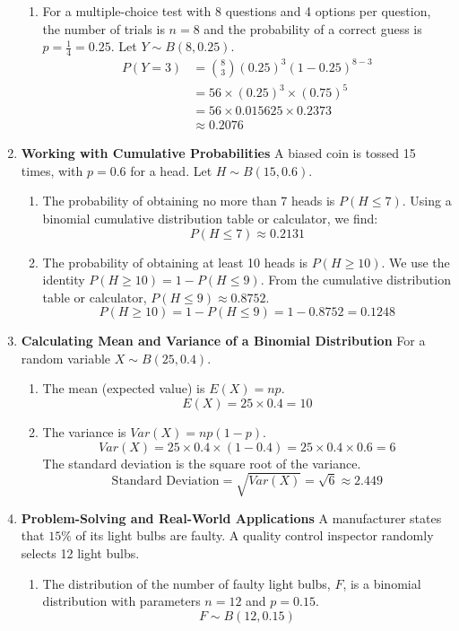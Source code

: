 \documentclass[12pt]{article}
\begin{document}
\begin{enumerate}
\begin{enumerate}
        \item For a multiple-choice test with 8 questions and 4 options per question, the number of trials is $n=8$ and the probability of a correct guess is $p = \frac{1}{4} = 0.25$. Let $Y \sim B(8, 0.25)$.
        \begin{align*}
        P(Y=3) &= \binom{8}{3} (0.25)^3 (1-0.25)^{8-3} \\
        &= 56 \times (0.25)^3 \times (0.75)^5 \\
        &= 56 \times 0.015625 \times 0.2373 \\
        &\approx 0.2076
        \end{align*}
    \end{enumerate}

    \item \textbf{Working with Cumulative Probabilities}
    A biased coin is tossed 15 times, with $p=0.6$ for a head. Let $H \sim B(15, 0.6)$.
    \begin{enumerate}
        \item The probability of obtaining no more than 7 heads is $P(H \le 7)$. Using a binomial cumulative distribution table or calculator, we find:
        $$ P(H \le 7) \approx 0.2131 $$

        \item The probability of obtaining at least 10 heads is $P(H \ge 10)$. We use the identity $P(H \ge 10) = 1 - P(H \le 9)$.
        From the cumulative distribution table or calculator, $P(H \le 9) \approx 0.8752$.
        $$ P(H \ge 10) = 1 - P(H \le 9) = 1 - 0.8752 = 0.1248 $$
    \end{enumerate}

    \item \textbf{Calculating Mean and Variance of a Binomial Distribution}
    For a random variable $X \sim B(25, 0.4)$.
    \begin{enumerate}
        \item The mean (expected value) is $E(X) = np$.
        $$ E(X) = 25 \times 0.4 = 10 $$

        \item The variance is $Var(X) = np(1-p)$.
        $$ Var(X) = 25 \times 0.4 \times (1-0.4) = 25 \times 0.4 \times 0.6 = 6 $$
        The standard deviation is the square root of the variance.
        $$ \text{Standard Deviation} = \sqrt{Var(X)} = \sqrt{6} \approx 2.449 $$
    \end{enumerate}

    \item \textbf{Problem-Solving and Real-World Applications}
    A manufacturer states that $15\%$ of its light bulbs are faulty. A quality control inspector randomly selects 12 light bulbs.
    \begin{enumerate}
        \item The distribution of the number of faulty light bulbs, $F$, is a binomial distribution with parameters $n=12$ and $p=0.15$.
        $$ F \sim B(12, 0.15) $$


\end{enumerate}
\end{enumerate}
\end{document}
